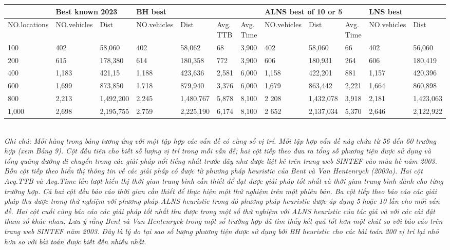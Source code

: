 \begin{table}[caption={Comparison Between ALNS Heuristic and Existing Heuristics}, label=tab:2]
    \begin{tabular}{@{}llllllllllll@{}}
        \toprule
        & \multicolumn{2}{l}{Best known 2023} & \multicolumn{4}{1}{BH best} & \multicolumn{3}{l}{ALNS best of 10 or 5}& \multicolumn{2}{l}{LNS best} \\
        \hline            
        \scriptsize{NO.locations}&\scriptsize{NO.vehicles}&\scriptsize{Dist}&\scriptsize{NO.vehicles}&\scriptsize{Dist}&\scriptsize{Avg. TTB}&\scriptsize{Avg. Time}&\scriptsize{NO.vehicles}&\scriptsize{Dist}&\scriptsize{Avg. Time}&\scriptsize{NO.vehicles}&\scriptsize{Dist}   \\ \midrule
        100  &402   &58,060    &402   &58,062    &68    &3,900 &402   &58,060    &66    &402    &56,060 \\
        200  &615   &178,380   &614   &180,358   &772   &3,900 &606   &180,931   &264   &606    &180,419 \\
        400  &1,183 &421,15    &1,188 &423,636   &2,581 &6,000 &1,158 &422,201   &881   &1,157  &420,396 \\ 
        600  &1,699 &873,850   &1,718 &879,940   &3,376 &6,000 &1,679 &863,442   &2,221 &1,664  &860,898 \\
        800  &2,213 &1,492,200 &2,245 &1,480,767 &5,878 &8,100 &2 208 &1,432,078 &3,918 &2,181  &1,423,063 \\
        1,000&2,698 &2,195,755 &2,759 &2,225,190 &6,174 &8,100 &2 652 &2,137,034 &5,370 &2,646  &2,122,922 \\ \bottomrule
        \end{tabular} \\
        \justify
        \textit{Ghi chú: Mỗi hàng trong bảng tương ứng với một tập hợp các vấn đề có cùng số vị trí. Mỗi tập hợp vấn đề này chứa từ 56 đến 60 trường hợp (xem Bảng 9). Cột đầu tiên cho biết số lượng vị trí trong mỗi vấn đề; hai cột tiếp theo đưa ra tổng số phương tiện được sử dụng và tổng quãng đường di chuyển trong các giải pháp nổi tiếng nhất trước đây như được liệt kê trên trang web SINTEF vào mùa hè năm 2003. Bốn cột tiếp theo hiển thị thông tin về các giải pháp có được từ phương pháp heuristic của Bent và Van Hentenryck (2003a). Hai cột Avg.TTB và Avg.Time lần lượt hiển thị thời gian trung bình cần thiết để đạt được giải pháp tốt nhất và thời gian trung bình dành cho từng trường hợp. Cả hai cột đều báo cáo thời gian cần thiết để thực hiện một thử nghiệm trên một phiên bản. Ba cột tiếp theo báo cáo các giải pháp thu được trong thử nghiệm với phương pháp ALNS heuristic trong đó phương pháp heuristic được áp dụng 5 hoặc 10 lần cho mỗi vấn đề. Hai cột cuối cùng báo cáo các giải pháp tốt nhất thu được trong một số thử nghiệm với ALNS heuristic của tác giả và với các cài đặt tham số khác nhau. Lưu ý rằng Bent và Van Hentenryck trong một số trường hợp đã tìm thấy kết quả tốt hơn một chút so với báo cáo trên trang web SINTEF năm 2003. Đây là lý do tại sao số lượng phương tiện được sử dụng bởi BH heuristic cho các bài toán 200 vị trí lại nhỏ hơn so với bài toán được biết đến nhiều nhất.}
\end{table}


